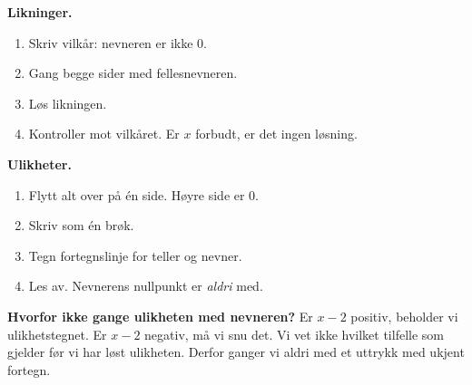 \begin{mustkunne}
\begin{minipage}[t]{0.47\linewidth}
\textbf{Likninger.}
\begin{enumerate}[leftmargin=1.4em,itemsep=1pt,topsep=2pt]
  \item Skriv vilkår: nevneren er ikke 0.
  \item Gang begge sider med fellesnevneren.
  \item Løs likningen.
  \item Kontroller mot vilkåret. Er $x$ forbudt, er det ingen løsning.
\end{enumerate}
\end{minipage}\hfill
\begin{minipage}[t]{0.50\linewidth}
\textbf{Ulikheter.}
\begin{enumerate}[leftmargin=1.4em,itemsep=1pt,topsep=2pt]
  \item Flytt alt over på én side. Høyre side er 0.
  \item Skriv som én brøk.
  \item Tegn fortegnslinje for teller og nevner.
  \item Les av. Nevnerens nullpunkt er \emph{aldri} med.
\end{enumerate}
\end{minipage}

\medskip
\textbf{Hvorfor ikke gange ulikheten med nevneren?} Er $x - 2$ positiv, beholder vi ulikhetstegnet. Er $x - 2$ negativ, må vi snu det.
Vi vet ikke hvilket tilfelle som gjelder før vi har løst ulikheten. Derfor ganger vi aldri med et uttrykk med ukjent fortegn.
\end{mustkunne}

